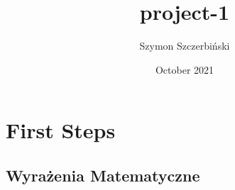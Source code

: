 \documentclass{article}
\title{project-1}
\author{Szymon Szczerbiński}
\date{October 2021}
\begin{document}
\maketitle

\section{First Steps}

\subsection{Wyrażenia Matematyczne}
\end{document}
